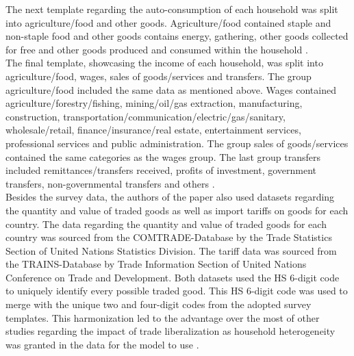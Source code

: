 The next template regarding the auto-consumption of each household was split into agriculture/food and other goods. Agriculture/food
contained staple and non-staple food and other goods contains energy, gathering, other goods collected for free and other goods
produced and consumed within the household \parencite[p.~58]{Artuc.2019}.\\
The final template, showcasing the income of each household, was split into agriculture/food, wages, sales of goods/services and 
transfers. The group agriculture/food included the same data as mentioned above. Wages contained agriculture/forestry/fishing,
mining/oil/gas extraction, manufacturing, construction, transportation/communication/electric/gas/sanitary, wholesale/retail,
finance/insurance/real estate, entertainment services, professional services and public administration. The group sales of
goods/services contained the same categories as the wages group. The last group transfers included remittances/transfers received,
profits of investment, government transfers, non-governmental transfers and others \parencite[p.~59]{Artuc.2019}. \\

Besides the survey data, the authors of the paper also used datasets regarding the quantity and value of traded goods as well 
as import tariffs on goods for each country. The data regarding the quantity and value of traded goods for each country was 
sourced from the COMTRADE-Database by the Trade Statistics Section of United Nations Statistics Division.
The tariff data was sourced from the TRAINS-Database by Trade Information Section of United Nations Conference on Trade and
Development. Both datasets used the HS 6-digit code to uniquely identify every possible traded good. This HS 6-digit code
was used to merge with the unique two and four-digit codes from the adopted survey templates. This harmonization led to the 
advantage over the most of other studies regarding the impact of trade liberalization as household heterogeneity was granted in 
the data for the model to use \parencite[p.~10]{Artuc.2019}. 
